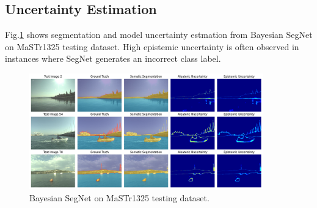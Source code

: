 \subsection{Uncertainty Estimation}
\label{section:UE}
Fig.\ref{fig:bs-mastr1325-disp} shows segmentation and model uncertainty estmation from Bayesian SegNet on 
MaSTr1325 testing dataset. High epistemic uncertainty is often observed in instances where SegNet generates an 
incorrect class label. 
\begin{figure}[ht!]
    \centering
    \includegraphics[width=0.9\textwidth]{figures/MaSTr1325/BayesianSegNet-panel.png}
    \caption{Bayesian SegNet on MaSTr1325 testing dataset.}
    \label{fig:bs-mastr1325-disp}
\end{figure} 

